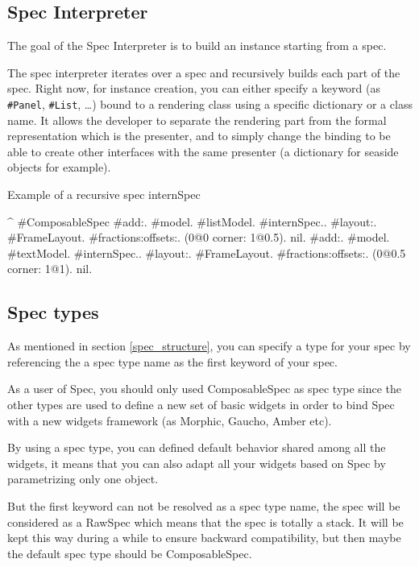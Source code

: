 \documentclass[a4paper,10pt,twoside]{book}
\begin{document}
\subsection{Spec Interpreter}

The goal of the Spec Interpreter is to build an instance starting from a spec.

The spec interpreter iterates over a spec and recursively builds each part of the spec. Right now, for instance creation, you can either specify a keyword (as \verb+#Panel+, \verb+#List+, \dots) bound to a rendering class using a specific dictionary or a class name. It allows the developer to separate the rendering part from the formal representation which is the presenter, and to simply change the binding to be able to create other interfaces with the same presenter (a dictionary for seaside objects for example).

\begin{method}{Example of a recursive spec}
internSpec

	^ { #ComposableSpec
			#add:. {{#model. #listModel. #internSpec.}.
						#layout:. {#FrameLayout.
									#fractions:offsets:. (0@0 corner: 1@0.5). nil}}.
			#add:. {{#model. #textModel. #internSpec.}.
						#layout:. {#FrameLayout.
									#fractions:offsets:. (0@0.5 corner: 1@1). nil}}}.
\end{method} 

\subsection{Spec types}

As mentioned in section \ref{spec_structure}, you can specify a type for your spec by referencing the a spec type name as the first keyword of your spec.

As a user of Spec, you should only used ComposableSpec as spec type since the other types are used to define a new set of basic widgets in order to bind Spec with a new widgets framework (as Morphic, Gaucho, Amber etc).

By using a spec type, you can defined default behavior shared among all the widgets, it means that you can also adapt all your widgets based on Spec by parametrizing only one object.

But the first keyword can not be resolved as a spec type name, the spec will be considered as a RawSpec which means that the spec is totally a stack. It will be kept this way during a while to ensure backward compatibility, but then maybe the default spec type should be ComposableSpec.
\end{document}
